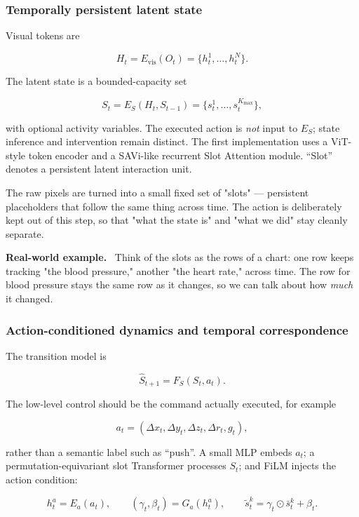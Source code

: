 \documentclass[11pt]{article}
\newenvironment{plainword}{%
  \par\medskip\noindent\begin{minipage}{\textwidth}%
  \color{gray!75!black}\small\itshape
}{%
  \end{minipage}\par\medskip}
\newenvironment{example}{%
  \par\smallskip\noindent\begin{minipage}{\textwidth}%
  \color{teal!60!black}\small
  \textbf{\color{teal!70!black}Real-world example.}\
}{%
  \end{minipage}\par\smallskip}
\begin{document}
\subsubsection*{Temporally persistent latent state}

Visual tokens are

\[
H_t=E_{\mathrm{vis}}(O_t)=\{h_t^1,\ldots,h_t^N\}.
\]

The latent state is a bounded-capacity set

\[
\boxed{S_t=E_S(H_t,S_{t-1})=\{s_t^1,\ldots,s_t^{K_{\max}}\},}
\]

with optional activity variables. The executed action is \emph{not} input to $E_S$; state inference and intervention remain
distinct. The first implementation uses a ViT-style token encoder and a SAVi-like recurrent Slot Attention module. ``Slot'' denotes
a persistent latent interaction unit.

\begin{plainword}
The raw pixels are turned into a small fixed set of "slots" --- persistent placeholders that follow the same thing across time. The
action is deliberately kept out of this step, so that "what the state is" and "what we did" stay cleanly separate.
\end{plainword}

\begin{example}
Think of the slots as the rows of a chart: one row keeps tracking "the blood pressure," another "the heart rate," across time. The
row for blood pressure stays the same row as it changes, so we can talk about how \emph{much} it changed.
\end{example}

\subsubsection*{Action-conditioned dynamics and temporal correspondence}

The transition model is

\[
\boxed{\widehat S_{t+1}=F_S(S_t,a_t).}
\]

The low-level control should be the command actually executed, for example

\[
a_t=(\Delta x_t,\Delta y_t,\Delta z_t,\Delta r_t,g_t),
\]

rather than a semantic label such as ``push''. A small MLP embeds $a_t$; a permutation-equivariant slot Transformer processes
$S_t$; and FiLM injects the action condition:

\[
h_t^a=E_a(a_t),\qquad
(\gamma_t,\beta_t)=G_a(h_t^a),\qquad
\widetilde s_t^k=\gamma_t\odot \bar s_t^k+\beta_t.
\]
\end{document}
